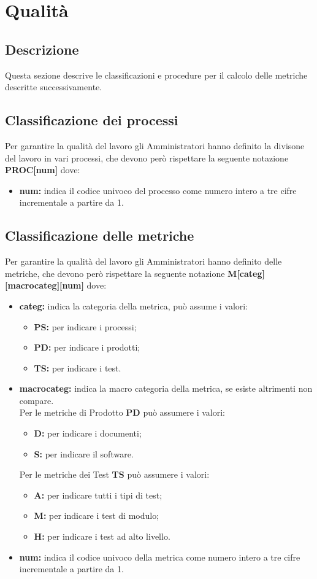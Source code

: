 \documentclass[NormeDiProgetto.tex]{subfiles}
\begin{document}
	
	\section{Qualità}
	\subsection{Descrizione}
	Questa sezione descrive le classificazioni e procedure per il calcolo delle metriche descritte successivamente.
	\subsection{Classificazione dei processi}
	Per garantire la qualità del lavoro gli Amministratori hanno definito la divisone del lavoro in vari processi, che devono però rispettare la seguente notazione \textbf{PROC[num]}	dove:
	\begin{itemize}
		\item \textbf{num:} indica il codice univoco del processo come numero intero a tre cifre incrementale a partire da 1.
	\end{itemize}	
	
	\subsection{Classificazione delle metriche}
	Per garantire la qualità del lavoro gli Amministratori hanno definito delle metriche, che devono però rispettare la seguente notazione \textbf{M[categ][macrocateg][num]}	dove:
	\begin{itemize}
		\item \textbf{categ:} indica la categoria della metrica, può assume i valori:
		\begin{itemize}
			\item \textbf{PS:} per indicare i processi;
			\item \textbf{PD:} per indicare i prodotti;
			\item \textbf{TS:} per indicare i test.
		\end{itemize}
		\item \textbf{macrocateg:} indica la macro categoria della metrica, se esiste altrimenti non compare.\\
		Per le metriche di Prodotto \textbf{PD} può assumere i valori:
		\begin{itemize}
			\item \textbf{D:} per indicare i documenti;
			\item \textbf{S:} per indicare il software.
		\end{itemize}
		Per le metriche dei Test \textbf{TS} può assumere i valori:
		\begin{itemize}
			\item \textbf{A:} per indicare tutti i tipi di test;
			\item \textbf{M:} per indicare i test di modulo;
			\item \textbf{H:} per indicare i test ad alto livello.		
		\end{itemize}
		\item \textbf{num:} indica il codice univoco della metrica come numero intero a tre cifre incrementale a partire da 1.
	\end{itemize}	
	
\end{document}

